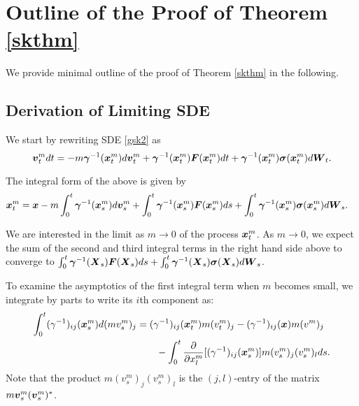 \section{Outline of the Proof of Theorem \ref{skthm}} \label{proof_sketch}
We provide minimal outline of the proof of Theorem \ref{skthm} in the following.

\subsection{Derivation of Limiting SDE} 
We start by rewriting SDE \eqref{gsk2} as
\begin{equation}\boldsymbol{v}^m_{t} dt = - m \boldsymbol{\gamma}^{-1}(\boldsymbol{x}^m_{t})  d\boldsymbol{v}^m_{t} + \boldsymbol{\gamma}^{-1}(\boldsymbol{x}^m_{t}) \boldsymbol{F}(\boldsymbol{x}^m_{t}) dt + \boldsymbol{\gamma}^{-1}(\boldsymbol{x}^m_{t}) \boldsymbol{\sigma}(\boldsymbol{x}^m_{t}) d\boldsymbol{W}_{t}.\end{equation}

The integral form of the above is given by
\begin{align}
\boldsymbol{x}^m_{t} &= \boldsymbol{x} - m\int_{0}^{t} \boldsymbol{\gamma}^{-1}(\boldsymbol{x}^m_{s})  d\boldsymbol{v}^m_{s} + \int_{0}^{t} \boldsymbol{\gamma}^{-1}(\boldsymbol{x}^m_{s}) \boldsymbol{F}(\boldsymbol{x}^m_{s}) ds + \int_{0}^{t} \boldsymbol{\gamma}^{-1}(\boldsymbol{x}^m_{s}) \boldsymbol{\sigma}(\boldsymbol{x}^m_{s}) d\boldsymbol{W}_{s}.
\end{align}

We are interested in the limit as $m \to 0$ of the process $\boldsymbol{x}^m_{t}$. As $m \to 0$, we expect the sum of the second and third integral terms in the right hand side above to converge to $\int_0^t \boldsymbol{\gamma}^{-1}(\boldsymbol{X}_s) \boldsymbol{F}(\boldsymbol{X}_s) ds + \int_0^t \boldsymbol{\gamma}^{-1}(\boldsymbol{X}_s) \boldsymbol{\sigma}(\boldsymbol{X}_s) d\boldsymbol{W}_s$. 

To examine the asymptotics of the first integral term when $m$ becomes small, we integrate by parts to write its $i$th component  as:
\begin{align} 
\int_{0}^{t} (\gamma^{-1})_{ij}(\boldsymbol{x}^m_{s}) d(m v^m_{s})_{j} &= (\gamma^{-1})_{ij}(\boldsymbol{x}^m_{t})  m (v^m_{t})_{j} - (\gamma^{-1})_{ij}(\boldsymbol{x})  m (v^m)_{j} \nonumber
\\ 
&\ \ \ \ \ \ - \int_{0}^{t} \frac{\partial}{\partial x^m_{l}}[(\gamma^{-1})_{ij}(\boldsymbol{x}^m_{s})] m (v^m_{s})_{j} (v^m_{s})_{l} ds.
\end{align}
Note that the product $ m (v^m_{s})_{j} (v^m_{s})_{l}$ is the $(j,l)$-entry of the matrix $m \boldsymbol{v}^m_{s} (\boldsymbol{v}^m_{s})^{*}$. 

